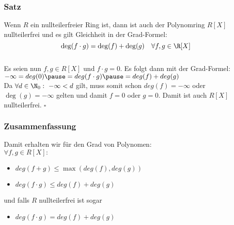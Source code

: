 %
\begin{frame}\frametitle{Satz}
Wenn $R$ ein nullteilerfreier Ring ist, dann ist auch der Polynomring $R[X]$ nullteilerfrei und es gilt Gleichheit in der Grad-Formel:
$$
\deg(f\cdot g) = \deg(f) +\deg(g) \quad \forall f,g \in \R[X]
$$
\vfill
{}\\
Es seien nun $f,g \in R[X]$ und $f\cdot g=0$. \pause Es folgt dann mit der Grad-Formel:\\
\vspace{2mm}
$
-\infty=deg(0)\pause=deg(f\cdot g)\pause =deg(f) + deg(g)
$\\
\vspace{2mm}\pause
Da $\forall d \in \N_0: \ -\infty < d$ gilt, muss somit schon $deg(f)=-\infty$ oder $\deg(g)=-\infty$ gelten und damit $f=0$ oder $g=0$. Damit ist auch $R[X]$ nullteilerfrei. \hfill $\square$
\end{frame}
%
\begin{frame}\frametitle{Zusammenfassung}
Damit erhalten wir für den Grad von Polynomen:\\
\vfill
$\forall f,g \in R[X]:$
\begin{itemize}
\item $deg(f+g)\le \max(deg(f),deg(g))$ \pause
\item $deg(f\cdot g)\le deg(f)+deg(g)$ \pause
\end{itemize}
\vfill
und falls $R$ nullteilerfrei ist sogar
\begin{itemize}
\item $deg(f\cdot g)= deg(f)+deg(g)$
\end{itemize}
\end{frame}
%

